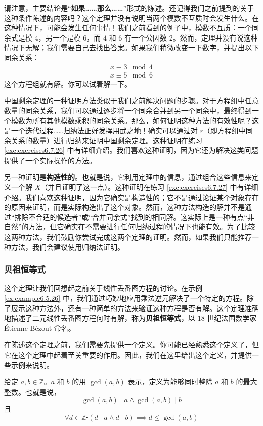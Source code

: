 请注意，主要结论是``\textbf{如果……那么……}''形式的陈述。还记得我们之前提到的关于这种条件陈述的内容吗？这个定理并没有说明当两个模数不互质时会发生什么。在这种情况下，可能会发生任何事情！我们之前看到的例子中，模数不互质：一个同余式是模 $4$，另一个是模 $6$，而 $4$ 和 $6$ 有一个公因数 $2$。然而，定理并没有说这种情况下无解；我们需要自己去找出答案。如果我们稍微改变一下数字，并提出以下同余关系：
\begin{align*}
    x \equiv 3 \mod 4 \\
    x \equiv 5 \mod 6
\end{align*}
这个方程组就有解。你可以试着解一下。

中国剩余定理的一种证明方法类似于我们之前解决问题的步骤。对于方程组中任意数量的同余关系，我们可以通过逐步将一个同余合并到另一个同余中，最终得到一个模数为所有其他模数乘积的同余关系。那么，如何证明这种方法的有效性呢？这是一个迭代过程……归纳法正好发挥用武之地！确实可以通过对 $r$（即方程组中同余关系的数量）进行归纳来证明中国剩余定理。这种证明在练习 \ref{exc:exercises6.7.26} 中有详细介绍。我们喜欢这种证明，因为它还为解决这类问题提供了一个实际操作的方法。

另一种证明是\textbf{构造性的}。也就是说，它利用定理中的信息，通过组合这些信息来定义一个解 $X$（并且证明了这一点）。这种证明在练习 \ref{exc:exercises6.7.27} 中有详细介绍。我们喜欢这种证明，因为它确实是构造性的；它不是通过论证某个对象存在的原因来证明，而是实际构造出了这个对象。然而，这种方法构造的解并不是通过``排除不合适的候选者''或``合并同余式''找到的相同解。这实际上是一种有点``非自然''的方法，但它确实在不需要进行任何归纳过程的情况下也能有效。为了比较这两种方法，我们鼓励你尝试完成这两个定理的证明。然而，如果我们只能推荐一种方法，我们会建议使用归纳法证明。

\subsubsection*{贝祖恒等式}

这个定理让我们回想起之前关于线性丢番图方程的讨论。在示例 \ref{ex:example6.5.26} 中，我们通过巧妙地应用乘法逆元解决了一个特定的方程。除了展示这种方法外，还有一种简单的方法来验证这种方程是否有解。这个定理准确地描述了二元线性丢番图方程何时有解，称为\textbf{贝祖恒等式}，以 $18$ 世纪法国数学家 Étienne Bézout 命名。

在陈述这个定理之前，我们需要先提供一个定义。你可能已经熟悉这个定义了，但它在这个定理中起着至关重要的作用。因此，我们在这里给出这个定义，并提供一些示例来说明。

\begin{definition}[最大公约数]\label{def:definition6.5.29}
    给定 $a,b \in \mathbb{Z}$。$a$ 和 $b$ 的用 $\gcd(a, b)$ 表示，定义为能够同时整除 $a$ 和 $b$ 的最大整数。也就是说，
    \[\gcd(a, b) \mid a \land \gcd(a, b) \mid b\]
    且
    \[\forall d \in \mathbb{Z} \centerdot (d \mid a \land d \mid b) \implies d \le \gcd(a, b)\]
\end{definition}

